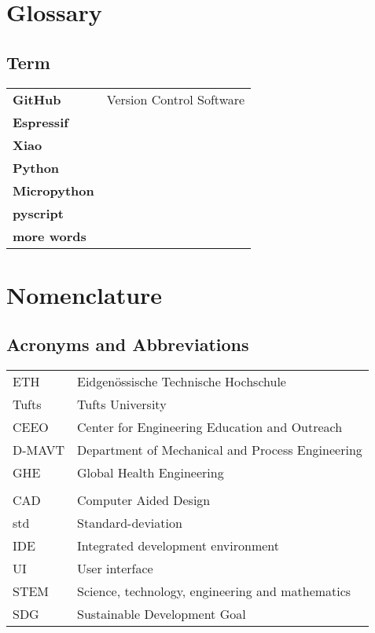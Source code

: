 \newpage%
\clearpage%
\chapter*{Glossary}%
%
%
%

\section*{\hspace{0pt}Term \hspace{129pt}{Definition}}%
{\renewcommand{\arraystretch}{1.1} \renewcommand{\tabcolsep}{0.0cm}
\begin{tabular}{>{\raggedright \bfseries}p{} p{}}
GitHub          & Version Control Software\\
Espressif \\
Xiao    \\
Python \\
Micropython \\
pyscript \\
more words
\end{tabular}
}

\chapter*{Nomenclature}%
%
%
%

\section*{Acronyms and Abbreviations}
{\renewcommand{\arraystretch}{1.1} \renewcommand{\tabcolsep}{0.2cm}
\begin{tabular}[h]{@{}p{} @{}p{}@{}}
ETH				&Eidgen\"ossische Technische Hochschule\\
Tufts           &Tufts University\\
CEEO            &Center for Engineering Education and Outreach\\
D-MAVT			&Department of Mechanical and Process Engineering\\
GHE 			&Global Health Engineering\\\\

CAD				&Computer Aided Design \\
std             &Standard-deviation\\
IDE             &Integrated development environment\\
UI              &User interface\\
STEM            &Science, technology, engineering and mathematics\\
SDG             &Sustainable Development Goal


\end{tabular}
}

